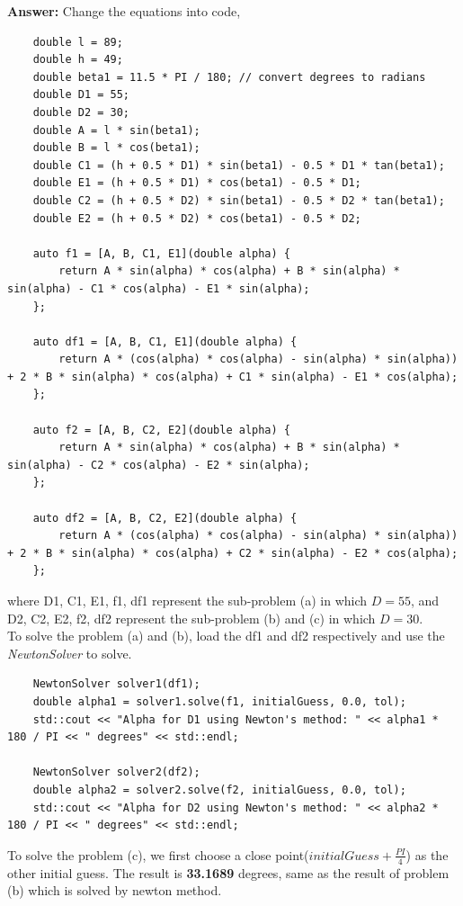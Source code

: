 \documentclass{article}
\begin{document}
\begin{CJK}{UTF8}{gbsn}
\textbf{Answer: }
Change the equations into code,
\begin{verbatim}
    double l = 89;
    double h = 49;
    double beta1 = 11.5 * PI / 180; // convert degrees to radians
    double D1 = 55;
    double D2 = 30;
    double A = l * sin(beta1);
    double B = l * cos(beta1);
    double C1 = (h + 0.5 * D1) * sin(beta1) - 0.5 * D1 * tan(beta1);
    double E1 = (h + 0.5 * D1) * cos(beta1) - 0.5 * D1;
    double C2 = (h + 0.5 * D2) * sin(beta1) - 0.5 * D2 * tan(beta1);
    double E2 = (h + 0.5 * D2) * cos(beta1) - 0.5 * D2;

    auto f1 = [A, B, C1, E1](double alpha) {
        return A * sin(alpha) * cos(alpha) + B * sin(alpha) * sin(alpha) - C1 * cos(alpha) - E1 * sin(alpha);
    };

    auto df1 = [A, B, C1, E1](double alpha) {
        return A * (cos(alpha) * cos(alpha) - sin(alpha) * sin(alpha)) + 2 * B * sin(alpha) * cos(alpha) + C1 * sin(alpha) - E1 * cos(alpha);
    };

    auto f2 = [A, B, C2, E2](double alpha) {
        return A * sin(alpha) * cos(alpha) + B * sin(alpha) * sin(alpha) - C2 * cos(alpha) - E2 * sin(alpha);
    };

    auto df2 = [A, B, C2, E2](double alpha) {
        return A * (cos(alpha) * cos(alpha) - sin(alpha) * sin(alpha)) + 2 * B * sin(alpha) * cos(alpha) + C2 * sin(alpha) - E2 * cos(alpha);
    };
\end{verbatim}
where D1, C1, E1, f1, df1 represent the sub-problem (a) in which $D = 55$, and D2, C2, E2, f2, df2 represent the sub-problem (b) and (c) in which $D = 30$.\\


To solve the problem (a) and (b), load the df1 and df2 respectively and use the \textit{NewtonSolver} to solve.
\begin{verbatim}
    NewtonSolver solver1(df1);
    double alpha1 = solver1.solve(f1, initialGuess, 0.0, tol);
    std::cout << "Alpha for D1 using Newton's method: " << alpha1 * 180 / PI << " degrees" << std::endl;
    
    NewtonSolver solver2(df2);
    double alpha2 = solver2.solve(f2, initialGuess, 0.0, tol);
    std::cout << "Alpha for D2 using Newton's method: " << alpha2 * 180 / PI << " degrees" << std::endl;
\end{verbatim}
To solve the problem (c), we first choose a close point($initialGuess+\frac{PI}{4}$) as the other initial guess. The result is \textbf{33.1689} degrees, same as the result of problem (b) which is solved by newton method.\\



\end{CJK}
\end{document}

